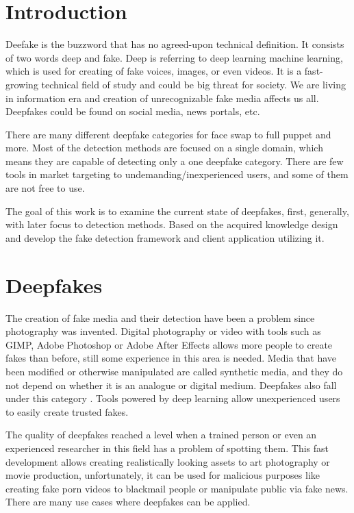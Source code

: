 \chapter{Introduction}

Deefake is the buzzword that has no agreed-upon technical definition. It consists of two words deep and fake. Deep is referring to deep learning machine learning, which is used for creating of fake voices, images, or even videos. It is a fast-growing technical field of study and could be big threat for society. We are living in information era and creation of unrecognizable fake media affects us all. Deepfakes could be found on social media, news portals, etc.

There are many different deepfake categories for face swap to full puppet and more. Most of the detection methods are focused on a single domain, which means they are capable of detecting only a one deepfake category. There are few tools in market targeting to undemanding/inexperienced users, and some of them are not free to use.

The goal of this work is to examine the current state of deepfakes, first, generally, with later focus to detection methods. Based on the acquired knowledge design and develop the fake detection framework and client application utilizing it.

\chapter{Deepfakes}

The creation of fake media and their detection have been a problem since photography was invented. Digital photography or video with tools such as GIMP, Adobe Photoshop or Adobe After Effects allows more people to create fakes than before, still some experience in this area is needed. Media that have been modified or otherwise manipulated are called synthetic media, and they do not depend on whether it is an analogue or digital medium. Deepfakes also fall under this category \cite{IncreasingThreatofDeepfakeIdentites}. Tools powered by deep learning allow unexperienced users to easily create trusted fakes. 

The quality of deepfakes reached a level when a trained person or even an experienced researcher in this field has a problem of spotting them. This fast development allows creating realistically looking assets to art photography or movie production, unfortunately, it can be used for malicious purposes like creating fake porn videos to blackmail people or manipulate public via fake news. There are many use cases where deepfakes can be applied.

